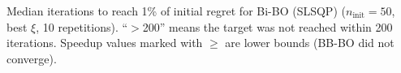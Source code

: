 \documentclass[12pt,a4paper]{article}%
\theoremstyle{plain}%
\theoremstyle{remark}%
\theoremstyle{definition}%
\providecommand{\DIFaddbegin}{} %
\providecommand{\DIFdelbegin}{} %
\providecommand{\DIFdelend}{} %
\newcommand{\DIFscaledelfig}{0.5}
\newlength{\DIFdelgraphicswidth} %
\newlength{\DIFdelgraphicsheight} %
\newcommand{\DIFaddincludegraphics}[2][]{{\color{blue}\fbox{\DIFOincludegraphics[#1]{#2}}}} %
\newcommand{\DIFdelincludegraphics}[2][]{%
\sbox{\DIFdelgraphicsbox}{\DIFOincludegraphics[#1]{#2}}%
\settoboxwidth{\DIFdelgraphicswidth}{\DIFdelgraphicsbox} %
\settoboxtotalheight{\DIFdelgraphicsheight}{\DIFdelgraphicsbox} %
\scalebox{\DIFscaledelfig}{%
\parbox[b]{\DIFdelgraphicswidth}{\usebox{\DIFdelgraphicsbox}\\[-\baselineskip] \rule{\DIFdelgraphicswidth}{0em}}\llap{\resizebox{\DIFdelgraphicswidth}{\DIFdelgraphicsheight}{%
\setlength{\unitlength}{\DIFdelgraphicswidth}%
\begin{picture}(1,1)%
\thicklines\linethickness{2pt} %
{\color[rgb]{1,0,0}\put(0,0){\framebox(1,1){}}}%
{\color[rgb]{1,0,0}\put(0,0){\line( 1,1){1}}}%
{\color[rgb]{1,0,0}\put(0,1){\line(1,-1){1}}}%
\end{picture}%
}\hspace*{3pt}}} %
} %
\DeclareRobustCommand{\DIFaddbegin}{\DIFOaddbegin \let\includegraphics\DIFaddincludegraphics} %
\DeclareRobustCommand{\DIFdelbegin}{\DIFOdelbegin \let\includegraphics\DIFdelincludegraphics} %
\DeclareRobustCommand{\DIFdelend}{\DIFOaddend \let\includegraphics\DIFOincludegraphics} %
\begin{document}
\begin{appendices}
\DIFdelbegin %
\DIFdelend \DIFaddbegin \begin{table}[htbp]
\centering
\caption{Median iterations to reach 1\% of initial regret for Bi-BO (SLSQP) ($n_\text{init}=50$, best $\xi$, 10 repetitions). ``$>$200'' means the target was not reached within 200 iterations. Speedup values marked with $\geq$ are lower bounds (BB-BO did not converge).}

\end{table}
\end{appendices}
\end{document}
